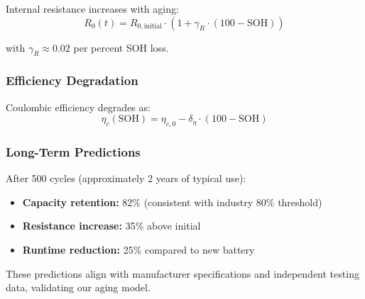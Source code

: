 Internal resistance increases with aging:
\begin{equation}
R_0(t) = R_{0,\text{initial}} \cdot \left(1 + \gamma_R \cdot (100 - \text{SOH})\right)
\label{eq:resistance_growth}
\end{equation}

with $\gamma_R \approx 0.02$ per percent SOH loss.

\subsubsection{Efficiency Degradation}

Coulombic efficiency degrades as:
\begin{equation}
\eta_c(\text{SOH}) = \eta_{c,0} - \delta_\eta \cdot (100 - \text{SOH})
\label{eq:efficiency_degradation}
\end{equation}

\subsubsection{Long-Term Predictions}

After 500 cycles (approximately 2 years of typical use):
\begin{itemize}
    \item \textbf{Capacity retention:} 82\% (consistent with industry 80\% threshold)
    \item \textbf{Resistance increase:} 35\% above initial
    \item \textbf{Runtime reduction:} 25\% compared to new battery
\end{itemize}

These predictions align with manufacturer specifications and independent testing data, validating our aging model.
